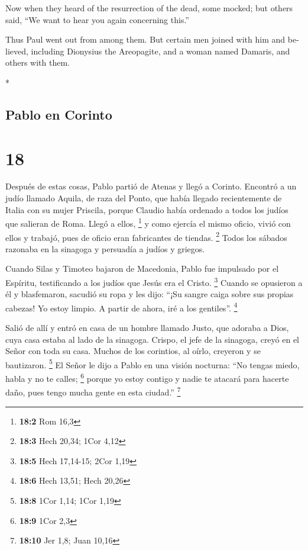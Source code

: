 \begin{paracol}{2}
\begin{otherlanguage}{english}
 Now when they heard of the resurrection of the dead,
some mocked; but others said, ``We want to hear you again concerning
this.''

 Thus Paul went out from among them.  But
certain men joined with him and believed, including Dionysius the
Areopagite, and a woman named Damaris, and others with them.

\end{otherlanguage}

\switchcolumn[0]*

\hypertarget{pablo-en-corinto}{%
\subsection{Pablo en Corinto}\label{pablo-en-corinto}}

\hypertarget{section-34}{%
\section{18}\label{section-34}}

 Después de estas cosas, Pablo partió de Atenas y llegó a
Corinto.  Encontró a un judío llamado Aquila, de raza del
Ponto, que había llegado recientemente de Italia con su mujer Priscila,
porque Claudio había ordenado a todos los judíos que salieran de Roma.
Llegó a ellos, \footnote{\textbf{18:2} Rom 16,3}  y como
ejercía el mismo oficio, vivió con ellos y trabajó, pues de oficio eran
fabricantes de tiendas. \footnote{\textbf{18:3} Hech 20,34; 1Cor 4,12}
 Todos los sábados razonaba en la sinagoga y persuadía a
judíos y griegos.

 Cuando Silas y Timoteo bajaron de Macedonia, Pablo fue
impulsado por el Espíritu, testificando a los judíos que Jesús era el
Cristo. \footnote{\textbf{18:5} Hech 17,14-15; 2Cor 1,19} 
Cuando se opusieron a él y blasfemaron, sacudió su ropa y les dijo:
``¡Su sangre caiga sobre sus propias cabezas! Yo estoy limpio. A partir
de ahora, iré a los gentiles''. \footnote{\textbf{18:6} Hech 13,51; Hech
  20,26}

 Salió de allí y entró en casa de un hombre llamado Justo,
que adoraba a Dios, cuya casa estaba al lado de la sinagoga.
 Crispo, el jefe de la sinagoga, creyó en el Señor con
toda su casa. Muchos de los corintios, al oírlo, creyeron y se
bautizaron. \footnote{\textbf{18:8} 1Cor 1,14; 1Cor 1,19} 
El Señor le dijo a Pablo en una visión nocturna: ``No tengas miedo,
habla y no te calles; \footnote{\textbf{18:9} 1Cor 2,3} 
porque yo estoy contigo y nadie te atacará para hacerte daño, pues tengo
mucha gente en esta ciudad.'' \footnote{\textbf{18:10} Jer 1,8; Juan
  10,16}


\end{paracol}
